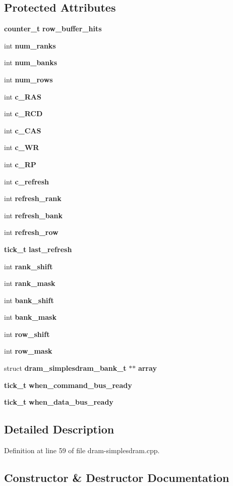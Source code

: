 \subsection*{Protected Attributes}
\begin{CompactItemize}
\item 
{\bf counter\_\-t} {\bf row\_\-buffer\_\-hits}
\item 
int {\bf num\_\-ranks}
\item 
int {\bf num\_\-banks}
\item 
int {\bf num\_\-rows}
\item 
int {\bf c\_\-RAS}
\item 
int {\bf c\_\-RCD}
\item 
int {\bf c\_\-CAS}
\item 
int {\bf c\_\-WR}
\item 
int {\bf c\_\-RP}
\item 
int {\bf c\_\-refresh}
\item 
int {\bf refresh\_\-rank}
\item 
int {\bf refresh\_\-bank}
\item 
int {\bf refresh\_\-row}
\item 
{\bf tick\_\-t} {\bf last\_\-refresh}
\item 
int {\bf rank\_\-shift}
\item 
int {\bf rank\_\-mask}
\item 
int {\bf bank\_\-shift}
\item 
int {\bf bank\_\-mask}
\item 
int {\bf row\_\-shift}
\item 
int {\bf row\_\-mask}
\item 
struct {\bf dram\_\-simplesdram\_\-bank\_\-t} $\ast$$\ast$ {\bf array}
\item 
{\bf tick\_\-t} {\bf when\_\-command\_\-bus\_\-ready}
\item 
{\bf tick\_\-t} {\bf when\_\-data\_\-bus\_\-ready}
\end{CompactItemize}


\subsection{Detailed Description}


Definition at line 59 of file dram-simplesdram.cpp.

\subsection{Constructor \& Destructor Documentation}
